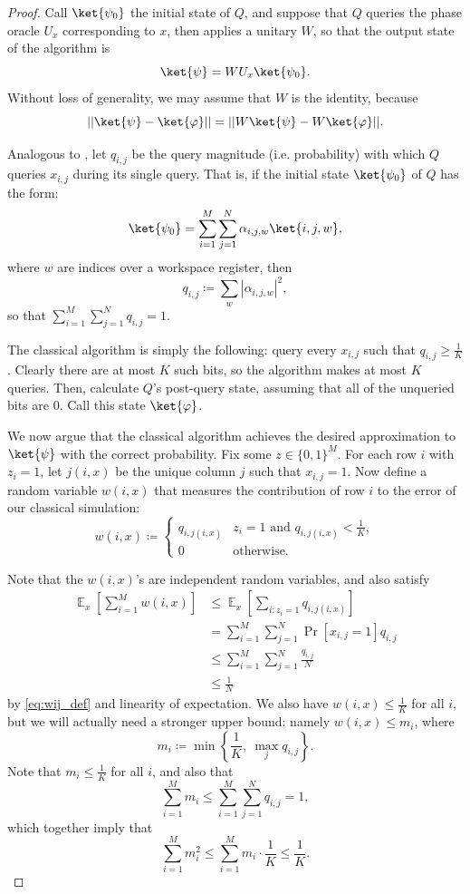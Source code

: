 \documentclass[11pt]{article}%
\newcommand{\E}{\mathop{\mathbb{E}}}
\begin{document}
\begin{proof}
Call $\ket{\psi_0}$ the initial state of $Q$, and suppose that $Q$ queries the phase oracle $U_x$ corresponding to $x$, then applies a unitary $W$, so that the output state of the algorithm is
\[
\ket{\psi} = W U_x \ket{\psi_0}.
\]
Without loss of generality, we may assume that $W$ is the identity, because
\[
|| \ket{\psi} - \ket{\varphi}|| = || W\ket{\psi} - W\ket{\varphi}||.
\]

Analogous to , let $q_{i,j}$ be the query magnitude (i.e. probability) with which $Q$ queries $x_{i,j}$ during its single query. That is, if the initial state $\ket{\psi_0}$ of $Q$ has the form:
\[
\ket{\psi_0} = \sum_{i=1}^M \sum_{j=1}^N \alpha_{i,j,w} \ket{i,j,w},
\]
where $w$ are indices over a workspace register, then
\[
q_{i,j} \coloneqq \sum_w |\alpha_{i,j,w}|^2,
\]
so that $\sum_{i=1}^M \sum_{j=1}^N q_{i,j} = 1$.

The classical algorithm is simply the following: query every $x_{i,j}$ such that $q_{i,j} \ge \frac{1}{K}$. Clearly there are at most $K$ such bits, so the algorithm makes at most $K$ queries. Then, calculate $Q$'s post-query state, assuming that all of the unqueried bits are $0$. Call this state $\ket{\varphi}$.

We now argue that the classical algorithm achieves the desired approximation to $\ket{\psi}$ with the correct probability. Fix some $z \in \{0,1\}^M$. For each row $i$ with $z_i = 1$, let $j(i, x)$ be the unique column $j$ such that $x_{i,j} = 1$. Now define a random variable $w(i,x)$ that measures the contribution of row $i$ to the error of our classical simulation:
\begin{equation}
\label{eq:wij_def}
w(i,x) \coloneqq \begin{cases}
q_{i,j(i,x)} & z_i = 1 \text{ and } q_{i,j(i,x)} < \frac{1}{K},\\
0 & \text{otherwise}.
\end{cases}
\end{equation}

Note that the $w(i,x)$'s are independent random variables, and also satisfy
\begin{align*}
\E_x \left[\sum_{i=1}^M w(i,x) \right] &\le \E_x \left[\sum_{i: z_i = 1} q_{i,j(i,x)} \right]\\
&= \sum_{i=1}^M \sum_{j=1}^N \Pr[x_{i,j} = 1] q_{i,j}\\
&\le \sum_{i=1}^M \sum_{j=1}^N \frac{q_{i,j}}{N} \\
&\le \frac{1}{N}
\end{align*}
by \eqref{eq:wij_def} and linearity of expectation. We also have $w(i, x) \le \frac{1}{K}$ for all $i$, but we will actually need a stronger upper bound: namely $w(i, x) \le m_i$, where
\[
m_i \coloneqq \min\left\{\frac{1}{K},\ \max_j q_{i,j}\right\}.
\]
Note that $m_i \le \frac{1}{K}$ for all $i$, and also that
\[
\sum_{i=1}^M m_i \le \sum_{i=1}^M \sum_{j=1}^N q_{i,j} = 1,
\]
which together imply that
\begin{equation}
\label{eq:sum_mi_squares}
\sum_{i=1}^M m_i^2 \le \sum_{i=1}^M m_i \cdot \frac{1}{K} \le \frac{1}{K}.
\end{equation}


\end{proof}
\end{document}
